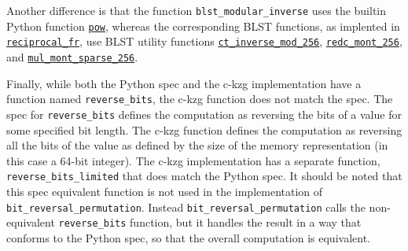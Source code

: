 \documentclass[12pt]{galois-whitepaper}
\begin{document}
Another difference is that the function \texttt{blst\_modular\_inverse} uses the builtin Python function 
\href{https://docs.python.org/3/library/functions.html#pow}{\texttt{pow}}, whereas the corresponding BLST functions, as implented in 
\href{https://github.com/supranational/blst/blob/415d4f0e2347a794091836a3065206edfd9c72f3/src/recip.c#L122}{\texttt{reciprocal\_fr}}, 
use BLST utility functions \href{https://github.com/supranational/blst/blob/master/src/vect.h#L142}{\texttt{ct\_inverse\_mod\_256}}, 
\href{https://github.com/supranational/blst/blob/415d4f0e2347a794091836a3065206edfd9c72f3/src/recip.c#L131}{\texttt{redc\_mont\_256}}, and 
\href{https://github.com/supranational/blst/blob/415d4f0e2347a794091836a3065206edfd9c72f3/src/recip.c#L132}{\texttt{mul\_mont\_sparse\_256}}.

Finally, while both the Python spec and the c-kzg implementation have a function named \texttt{reverse\_bits}, the c-kzg function does not 
match the spec. The spec for \texttt{reverse\_bits} defines the computation as reversing the bits of a value for some specified bit length. The c-kzg 
function defines the computation as reversing all the bits of the value as defined by the size of the memory representation (in this case a 64-bit integer). The 
c-kzg implementation has a separate function, \texttt{reverse\_bits\_limited} that does match the Python spec. It should be noted that this spec 
equivalent function is not used in the implementation of \texttt{bit\_reversal\_permutation}. Instead \texttt{bit\_reversal\_permutation} calls the 
non-equivalent \texttt{reverse\_bits} function, but it handles the result in a way that conforms to the Python spec, so that the overall computation 
is equivalent.

\newpage
\end{document}
